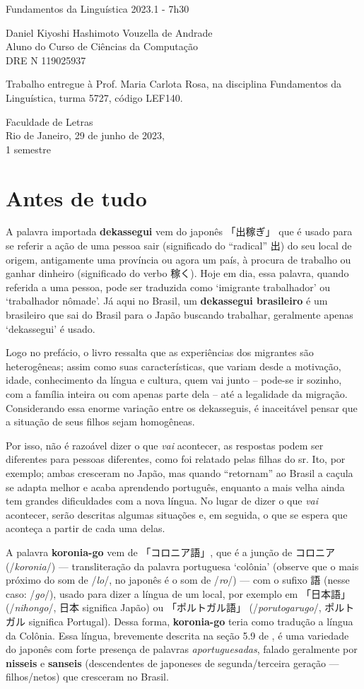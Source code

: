 \documentclass{article}
\date{}
\newcommand{\jap}[1]{#1}
\newcommand{\jquote}[1]{「#1」}
\newcommand{\keyword}[1]{\textbf{#1}}
\newcommand{\phone}[1]{\slash\textit{#1}\slash}
\newcommand{\dekassegui}{\jap{出稼ぎ}}
\newcommand{\koroniago}{\jap{コロニア語}}
\newcommand{\dre}{119025937}
\newcommand{\hashi}{Daniel Kiyoshi Hashimoto Vouzella de Andrade}
\newcommand{\mytitle}{Fundamentos da Linguística 2023.1 - 7h30}
\newcommand{\myauthor}{\hashi{} \\
    Aluno do Curso de Ciências da Computação \\
    DRE N\textdegree{} \dre{}
}
\newcommand{\makecapa}{
    \newpage
    \hfill\par\vfill

    \begin{center}
        \huge
        \mytitle{}
    \end{center}

    \vfill

    \begin{center}
        \Large
        \myauthor{}
    \end{center}

    \vfill
    \vfill
    \begin{multicols}{3}
        \par\hfill \columnbreak

        \par\hfill \columnbreak

        Trabalho entregue à
        Prof. Maria Carlota Rosa,
        na disciplina
        Fundamentos da Linguística,
        turma 5727,
        código LEF140.
    \end{multicols}

    \vfill

    \begin{center}
        Faculdade de Letras \\
        Rio de Janeiro, 29 de junho de 2023, \\
        1\textdegree{} semestre
    \end{center}

    \pagenumbering{gobble}
    \newpage
    \pagenumbering{arabic}
}
\begin{document}
\makecapa

\setcounter{section}{-1}
\section{Antes de tudo}

A palavra importada \keyword{dekassegui}
vem do japonês \jquote{\dekassegui{}}
que é usado para se referir a ação de uma pessoa
sair (significado do ``radical'' 出)
do seu local de origem,
antigamente uma província ou agora um país,
à procura de trabalho ou ganhar dinheiro
(significado do verbo 稼く).
Hoje em dia, essa palavra, quando referida a uma pessoa,
pode ser traduzida
como `imigrante trabalhador' ou `trabalhador nômade'.
Já aqui no Brasil, um \keyword{dekassegui brasileiro}
é um brasileiro que sai do Brasil para o Japão
buscando trabalhar,
geralmente apenas `dekassegui' é usado.

Logo no prefácio, o livro \cite{filhosdekasegi}
ressalta que as experiências dos migrantes são heterogêneas;
assim como suas características, que variam desde
a motivação, idade, conhecimento da língua e cultura,
quem vai junto
-- pode-se ir sozinho, com a família inteira ou
com apenas parte dela --
até a legalidade da migração.
Considerando essa enorme variação entre os dekasseguis,
é inaceitável pensar que a situação de seus filhos
sejam homogêneas.

Por isso, não é razoável dizer
o que \emph{vai} acontecer,
as respostas podem ser diferentes para pessoas diferentes,
como foi relatado pelas filhas do sr. Ito, por exemplo;
ambas cresceram no Japão,
mas quando ``retornam'' ao Brasil
a caçula se adapta melhor e acaba aprendendo português,
enquanto a mais velha ainda tem grandes dificuldades
com a nova língua.
No lugar de dizer o que \emph{vai} acontecer,
serão descritas algumas situações
e, em seguida,
o que se espera que aconteça
a partir de cada uma delas.

A palavra \keyword{koronia-go} vem de \jquote{\koroniago{}},
que é a junção de コロニア (\phone{koronia})
--- transliteração da palavra portuguesa `colônia'
(observe que o mais próximo do som de \phone{lo},
no japonês é o som de \phone{ro}) ---
com o sufixo 語 (nesse caso: \phone{go}),
usado para dizer a língua de um local,
por exemplo em \jquote{日本語}
(\phone{nihongo}, 日本 significa Japão)
ou \jquote{ポルトガル語}
(\phone{porutogarugo}, ポルトガル significa Portugal).
Dessa forma, \keyword{koronia-go} teria como tradução
a língua da Colônia\footnotemark{}.
Essa língua, brevemente descrita
na seção 5.9 de \cite{viagemling},
é uma variedade do japonês
com forte presença de palavras \emph{aportuguesadas},
falado geralmente por
\keyword{nisseis} e \keyword{sanseis}
(descendentes de japoneses de segunda/terceira geração ---
filhos/netos)
que cresceram no Brasil.
\end{document}
